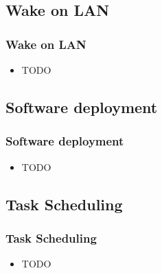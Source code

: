 \documentclass{beamer}
\begin{document}
\subsection{Wake on LAN}
\begin{frame}
\frametitle{Wake on LAN}
\begin{itemize}
%
\item TODO
%
\end{itemize}
\end{frame}

\subsection{Software deployment}

\begin{frame}
\frametitle{Software deployment}

\begin{itemize}
%
\item TODO
%
\end{itemize}
\end{frame}
\subsection{Task Scheduling}
\begin{frame}
\frametitle{Task Scheduling}
%
\begin{itemize}
%
\item TODO
%
\end{itemize}
\end{frame}
\end{document}
